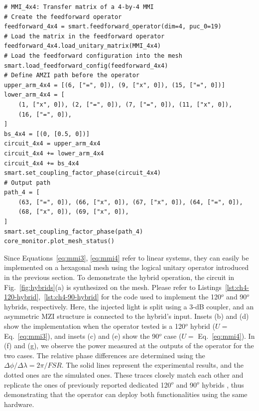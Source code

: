 \begin{lstlisting}[caption={Implementation of a 90$^o$ hybrid using a Feedforward operator},
label={lst:ch4-90-hybrid}]
# MMI_4x4: Transfer matrix of a 4-by-4 MMI
# Create the feedforward operator
feedforward_4x4 = smart.feedforward_operator(dim=4, puc_0=19)
# Load the matrix in the feedforward operator
feedforward_4x4.load_unitary_matrix(MMI_4x4)
# Load the feedforward configuration into the mesh
smart.load_feedforward_config(feedforward_4x4)
# Define AMZI path before the operator
upper_arm_4x4 = [(6, ["=", 0]), (9, ["x", 0]), (15, ["=", 0])]
lower_arm_4x4 = [
    (1, ["x", 0]), (2, ["=", 0]), (7, ["=", 0]), (11, ["x", 0]),
    (16, ["=", 0]),
]
bs_4x4 = [(0, [0.5, 0])]
circuit_4x4 = upper_arm_4x4
circuit_4x4 += lower_arm_4x4
circuit_4x4 += bs_4x4
smart.set_coupling_factor_phase(circuit_4x4)
# Output path 
path_4 = [
    (63, ["=", 0]), (66, ["x", 0]), (67, ["x", 0]), (64, ["=", 0]),
    (68, ["x", 0]), (69, ["x", 0]),
]
smart.set_coupling_factor_phase(path_4)
core_monitor.plot_mesh_status()
\end{lstlisting}

Since Equations~\eqref{eq:mmi3}, \eqref{eq:mmi4} refer to linear systems, they can easily be implemented on a hexagonal mesh using the logical unitary operator introduced in the previous section.
To demonstrate the hybrid operation, the circuit in Fig.~\ref{fig:hybrids}(a) is synthesized on the mesh.
Please refer to Listings~\ref{lst:ch4-120-hybrid},~\ref{lst:ch4-90-hybrid} for the code used to implement the 120$^o$ and 90$^o$ hybrids, respectively.
Here, the injected light is split using a 3-dB coupler, and an asymmetric MZI structure is connected to the hybrid's input.
Insets (b) and (d) show the implementation when the operator tested is a 120$^o$ hybrid ($U = $ Eq.~\eqref{eq:mmi3}), and insets (c) and (e) show the 90$^o$ case ($U = $ Eq.~\eqref{eq:mmi4}).
In (f) and (g), we observe the power measured at the outputs of the operator for the two cases.
The relative phase differences are determined using the $\Delta\phi/\Delta\lambda = 2\pi/FSR$.
The solid lines represent the experimental results, and the dotted ones are the simulated ones.
These traces closely match each other and replicate the ones of previously reported dedicated 120$^o$ and 90$^o$ hybrids \cite{saber_demonstration_2018, yu_high-performance_2020, reyes-iglesias_high-performance_2012}, thus demonstrating that the operator can deploy both functionalities using the same hardware.

